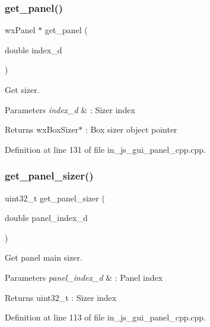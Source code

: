 \subsubsection{get\_panel()}
{\footnotesize\ttfamily wx\+Panel $\ast$ get\+\_\+panel (\begin{DoxyParamCaption}\item[{double}]{index\+\_\+d }\end{DoxyParamCaption})}



Get sizer. 


\begin{DoxyParams}{Parameters}
{\em index\+\_\+d} & \+: Sizer index \\
\hline
\end{DoxyParams}
\begin{DoxyReturn}{Returns}
wx\+Box\+Sizer$\ast$ \+: Box sizer object pointer 
\end{DoxyReturn}


Definition at line 131 of file in\+\_\+js\+\_\+gui\+\_\+panel\+\_\+cpp.\+cpp.

\mbox{\label{group___panel_gae7793b79ca78e3750f183921a0cdbf7f}} 
\subsubsection{get\_panel\_sizer()}
{\footnotesize\ttfamily uint32\+\_\+t get\+\_\+panel\+\_\+sizer (\begin{DoxyParamCaption}\item[{double}]{panel\+\_\+index\+\_\+d }\end{DoxyParamCaption})}



Get panel main sizer. 


\begin{DoxyParams}{Parameters}
{\em panel\+\_\+index\+\_\+d} & \+: Panel index \\
\hline
\end{DoxyParams}
\begin{DoxyReturn}{Returns}
uint32\+\_\+t \+: Sizer index 
\end{DoxyReturn}


Definition at line 113 of file in\+\_\+js\+\_\+gui\+\_\+panel\+\_\+cpp.\+cpp.

\mbox{\label{group___panel_gad9a078f6234681b96bba71f9a09df0e6}} 
